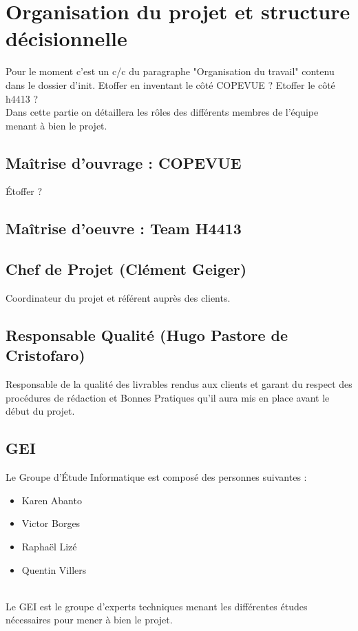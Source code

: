 \section{Organisation du projet et structure décisionnelle}

Pour le moment c'est un c/c du paragraphe "Organisation du travail" contenu
dans le dossier d'init. Etoffer en inventant le côté COPEVUE ? Etoffer le
côté h4413 ?\\


Dans cette partie on détaillera les rôles des différents membres de l'équipe
menant à bien le projet.


\subsection{Maîtrise d'ouvrage : COPEVUE}

Étoffer ?


\subsection{Maîtrise d'oeuvre : Team H4413}

\subsection{Chef de Projet (Clément Geiger)}

Coordinateur du projet et référent auprès des clients.


\subsection{Responsable Qualité (Hugo Pastore de Cristofaro)}

Responsable de la qualité des livrables rendus aux clients et garant du respect
des procédures de rédaction et Bonnes Pratiques qu'il aura mis
en place avant le début du projet.

\subsection{GEI}

Le Groupe d'Étude Informatique est composé des personnes suivantes :

\begin{itemize}
\item Karen Abanto
\item Victor Borges
\item Raphaël Lizé
\item Quentin Villers
\end{itemize}

\hfill\\

Le GEI est le groupe d'experts techniques menant les différentes études
nécessaires pour mener à bien le projet.
